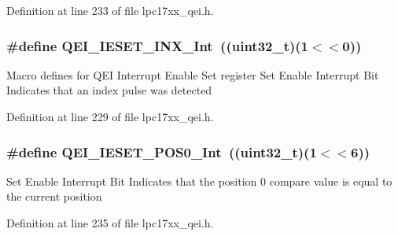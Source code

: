 \-Definition at line 233 of file lpc17xx\-\_\-qei.\-h.

\hypertarget{group___q_e_i___private___macros_ga15d22418f28e059fabec4dc10e5b1110}{
\subsubsection[{\-Q\-E\-I\-\_\-\-I\-E\-S\-E\-T\-\_\-\-I\-N\-X\-\_\-\-Int}]{\setlength{\rightskip}{0pt plus 5cm}\#define {\bf \-Q\-E\-I\-\_\-\-I\-E\-S\-E\-T\-\_\-\-I\-N\-X\-\_\-\-Int}~((uint32\-\_\-t)(1$<$$<$0))}}\label{group___q_e_i___private___macros_ga15d22418f28e059fabec4dc10e5b1110}
\-Macro defines for \-Q\-E\-I \-Interrupt \-Enable \-Set register \-Set \-Enable \-Interrupt \-Bit \-Indicates that an index pulse was detected 

\-Definition at line 229 of file lpc17xx\-\_\-qei.\-h.

\hypertarget{group___q_e_i___private___macros_ga94538a8c1b0f8d9751360c78a2565cab}{
\subsubsection[{\-Q\-E\-I\-\_\-\-I\-E\-S\-E\-T\-\_\-\-P\-O\-S0\-\_\-\-Int}]{\setlength{\rightskip}{0pt plus 5cm}\#define {\bf \-Q\-E\-I\-\_\-\-I\-E\-S\-E\-T\-\_\-\-P\-O\-S0\-\_\-\-Int}~((uint32\-\_\-t)(1$<$$<$6))}}\label{group___q_e_i___private___macros_ga94538a8c1b0f8d9751360c78a2565cab}
\-Set \-Enable \-Interrupt \-Bit \-Indicates that the position 0 compare value is equal to the current position 

\-Definition at line 235 of file lpc17xx\-\_\-qei.\-h.

